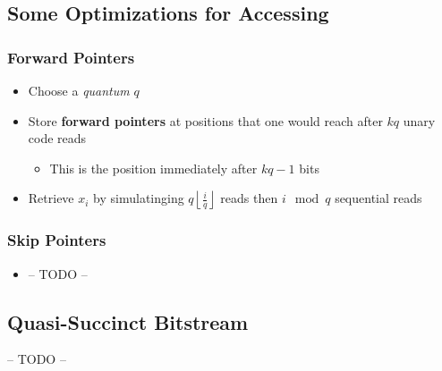 \documentclass[10pt]{article}
\begin{document}
\subsection{Some Optimizations for Accessing}\label{optimizations}

\subsubsection{Forward Pointers}\label{forward-pointers}
\begin{itemize}
\item
    Choose a \textit{quantum} \(q\)
\item
    Store \textbf{forward pointers} at positions that one would reach after 
    \(kq\) unary code reads
    \begin{itemize}
    \item
        This is the position immediately after \(kq - 1\) bits
    \end{itemize}
\item
    Retrieve \(x_i\) by simulatinging \(q \left \lfloor \frac{i}{q} \right \rfloor\) reads
    then \(i \mod q\) sequential reads
\end{itemize}
\subsubsection{Skip Pointers}\label{skip-pointers}
\begin{itemize}
\item
    -- TODO --
\end{itemize}

\subsection{Quasi-Succinct Bitstream}\label{quasi-succinct-bitstream}
-- TODO --
\end{document}
